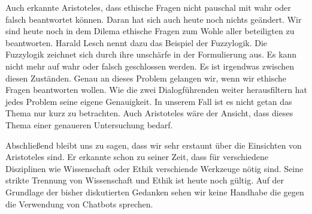 Auch erkannte Aristoteles, dass ethische Fragen nicht pauschal mit wahr oder falsch beantwortet können. Daran hat sich auch heute noch nichts geändert. Wir sind heute noch in dem Dilema ethische Fragen zum Wohle aller beteiligten zu beantworten. Harald Lesch nennt dazu das Beispiel der Fuzzylogik. Die Fuzzylogik zeichnet sich durch ihre unschärfe in der Formulierung aus. Es kann nicht mehr auf wahr oder falsch geschlossen werden. Es ist irgendwas zwischen diesen Zuständen. Genau an dieses Problem gelangen wir, wenn wir ethische Fragen beantworten wollen. \newline
Wie die zwei Dialogführenden weiter herausfiltern hat jedes Problem seine eigene Genauigkeit. In unserem Fall ist es nicht getan das Thema nur kurz zu betrachten. Auch Aristoteles wäre der Ansicht, dass dieses Thema einer genaueren Untersuchung bedarf.

Abschließend bleibt uns zu sagen, dass wir sehr erstaunt über die Einsichten von Aristoteles sind. Er erkannte schon zu seiner Zeit, dass für verschiedene Disziplinen wie Wissenschaft oder Ethik verschiende Werkzeuge nötig sind. Seine strikte Trennung von Wissenschaft und Ethik ist heute noch gültig. Auf der Grundlage der bisher diskutierten Gedanken sehen wir keine Handhabe die gegen die Verwendung von Chatbots sprechen. 


